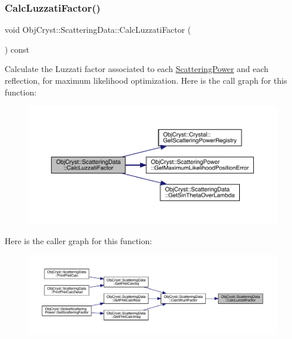 \subsubsection{\texorpdfstring{CalcLuzzatiFactor()}{CalcLuzzatiFactor()}}
{\footnotesize\ttfamily void Obj\+Cryst\+::\+Scattering\+Data\+::\+Calc\+Luzzati\+Factor (\begin{DoxyParamCaption}{ }\end{DoxyParamCaption}) const\hspace{0.3cm}{\ttfamily [protected]}}

Calculate the Luzzati factor associated to each \mbox{\hyperlink{class_obj_cryst_1_1_scattering_power}{Scattering\+Power}} and each reflection, for maximum likelihood optimization. Here is the call graph for this function\+:
\nopagebreak
\begin{figure}[H]
\begin{center}
\leavevmode
\includegraphics[width=350pt]{class_obj_cryst_1_1_scattering_data_a40e555c0ab59f92fda10dbe10cdee91b_cgraph}
\end{center}
\end{figure}
Here is the caller graph for this function\+:
\nopagebreak
\begin{figure}[H]
\begin{center}
\leavevmode
\includegraphics[width=350pt]{class_obj_cryst_1_1_scattering_data_a40e555c0ab59f92fda10dbe10cdee91b_icgraph}
\end{center}
\end{figure}
\mbox{\label{class_obj_cryst_1_1_scattering_data_aaf82b283529262aa6b0ec547e23c6b6d}} 
